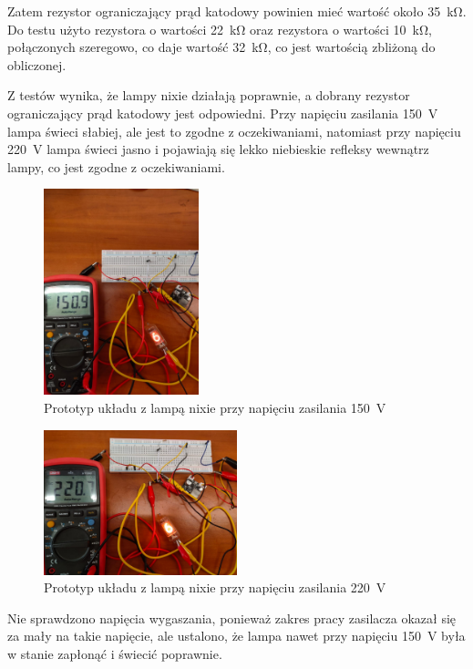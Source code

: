 \documentclass[../main.tex]{subfiles}
\begin{document}
Zatem rezystor ograniczający prąd katodowy powinien mieć wartość około \SI{35}{\kilo\ohm}.
Do testu użyto rezystora o wartości \SI{22}{\kilo\ohm} oraz rezystora o wartości \SI{10}{\kilo\ohm}, połączonych
szeregowo, co daje wartość \SI{32}{\kilo\ohm}, co jest wartością zbliżoną do obliczonej.


Z testów wynika, że lampy nixie działają poprawnie, a dobrany rezystor ograniczający prąd katodowy jest odpowiedni. 
Przy napięciu zasilania \SI{150}{\volt} lampa świeci słabiej, ale jest to zgodne z oczekiwaniami,
natomiast przy napięciu \SI{220}{\volt} lampa świeci jasno i pojawiają się lekko niebieskie refleksy wewnątrz lampy, co jest zgodne z oczekiwaniami.

\begin{figure}[H]
    \centering
    \includegraphics[width=0.4\textwidth]{nixie150V.jpeg}
    \caption{Prototyp układu z lampą nixie przy napięciu zasilania \SI{150}{\volt}}
\end{figure}


\begin{figure}[H]
    \centering
    \includegraphics[width=0.5\textwidth]{nixie220V.jpeg}
    \caption{Prototyp układu z lampą nixie przy napięciu zasilania \SI{220}{\volt}}
\end{figure}

Nie sprawdzono napięcia wygaszania, ponieważ zakres pracy zasilacza okazał się za mały na takie napięcie, 
ale ustalono, że lampa nawet przy napięciu \SI{150}{\volt} była w stanie zapłonąć i świecić poprawnie.
\end{document}
